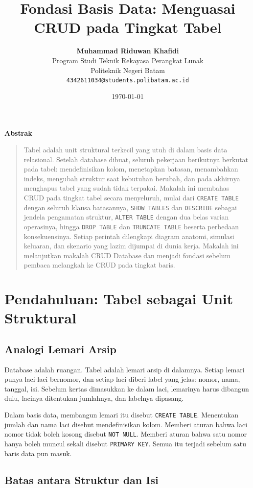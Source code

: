 \documentclass[11pt,a4paper]{article}
\title{\vspace{-1.5cm}\textbf{\sffamily\LARGE Fondasi Basis Data: Menguasai CRUD pada Tingkat Tabel}}
\author{
	\textbf{Muhammad Riduwan Khafidi} \\
	\small Program Studi Teknik Rekayasa Perangkat Lunak \\
	\small Politeknik Negeri Batam \\
	\small \texttt{4342611034@students.polibatam.ac.id}
}
\date{\small\today}
\renewenvironment{abstract}
{\small
	\begin{center}\textbf{\sffamily Abstrak}\end{center}
	\begin{quote}}
	{\end{quote}}
\begin{document}
\maketitle
\thispagestyle{empty}

\begin{abstract}
	Tabel adalah unit struktural terkecil yang utuh di dalam basis data relasional. Setelah database dibuat, seluruh pekerjaan berikutnya berkutat pada tabel: mendefinisikan kolom, menetapkan batasan, menambahkan indeks, mengubah struktur saat kebutuhan berubah, dan pada akhirnya menghapus tabel yang sudah tidak terpakai. Makalah ini membahas CRUD pada tingkat tabel secara menyeluruh, mulai dari \texttt{CREATE TABLE} dengan seluruh klausa batasannya, \texttt{SHOW TABLES} dan \texttt{DESCRIBE} sebagai jendela pengamatan struktur, \texttt{ALTER TABLE} dengan dua belas varian operasinya, hingga \texttt{DROP TABLE} dan \texttt{TRUNCATE TABLE} beserta perbedaan konsekuensinya. Setiap perintah dilengkapi diagram anatomi, simulasi keluaran, dan skenario yang lazim dijumpai di dunia kerja. Makalah ini melanjutkan makalah CRUD Database dan menjadi fondasi sebelum pembaca melangkah ke CRUD pada tingkat baris.
\end{abstract}

\section{Pendahuluan: Tabel sebagai Unit Struktural}

\subsection{Analogi Lemari Arsip}

Database adalah ruangan. Tabel adalah lemari arsip di dalamnya. Setiap lemari punya laci-laci bernomor, dan setiap laci diberi label yang jelas: nomor, nama, tanggal, isi. Sebelum kertas dimasukkan ke dalam laci, lemarinya harus dibangun dulu, lacinya ditentukan jumlahnya, dan labelnya dipasang.

Dalam basis data, membangun lemari itu disebut \texttt{CREATE TABLE}. Menentukan jumlah dan nama laci disebut mendefinisikan kolom. Memberi aturan bahwa laci nomor tidak boleh kosong disebut \texttt{NOT NULL}. Memberi aturan bahwa satu nomor hanya boleh muncul sekali disebut \texttt{PRIMARY KEY}. Semua itu terjadi sebelum satu baris data pun masuk.

\subsection{Batas antara Struktur dan Isi}
\end{document}

